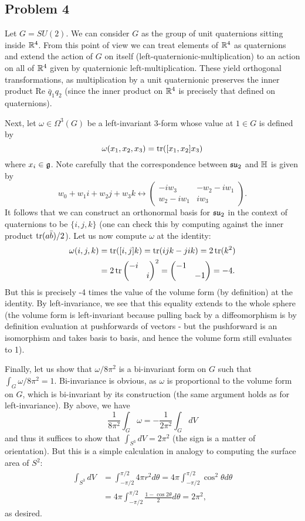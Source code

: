 \documentclass{../../mathnotes}
\begin{document}
\subsection*{Problem 4}

Let $G=SU(2)$. We can consider $G$ as the group of unit quaternions sitting inside $\mathbb{R}^4$. From this point of view we can treat elements of $\mathbb{R}^4$ as
quaternions and extend the action of $G$ on itself (left-quaternionic-multiplication) to an action on all of $\mathbb{R}^4$ given by quaternionic left-multiplication.
These yield orthogonal transformations, as multiplication by a unit quaternionic preserves the inner product $\text{Re }\bar q_1q_2$ (since the inner product on $\mathbb{R}^4$ is precisely
that defined on quaternions).

Next, let $\omega\in\Omega^3(G)$ be a left-invariant 3-form whose value at $1\in G$ is defined by
\[\omega(x_1,x_2,x_3)=\operatorname{tr} ([x_1,x_2]x_3)\]
where $x_i\in\mathfrak g$. Note carefully that the correspondence between $\mathfrak{su}_2$ and $\mathbb{H}$ is given by
\[w_0+w_1i+w_2j+w_3k \longleftrightarrow \begin{pmatrix}-iw_3&-w_2-iw_1\\w_2-iw_1&iw_3\end{pmatrix}.\]
It follows that we can construct an orthonormal basis for $\mathfrak{su}_2$ in the context of quaternions to be $\{i,j,k\}$ (one can check this
by computing against the inner product $\operatorname{tr}(a\bar b)/2$). Let us now compute $\omega$ at the identity:
\begin{align*}
    \omega(i,j,k)&=\operatorname{tr}([i,j]k)=\operatorname{tr}(ijk-jik)=2\operatorname{tr}(k^2)\\
    &=2\operatorname{tr}\begin{pmatrix}-i&\\&i\end{pmatrix}^2=\begin{pmatrix}-1&\\&-1\end{pmatrix}=-4.
\end{align*}
But this is precisely -4 times the value of the volume form (by definition) at the identity. By left-invariance, we see that this equality
extends to the whole sphere (the volume form is left-invariant because pulling back by a diffeomorphism is by definition evaluation at pushforwards
of vectors - but the pushforward is an isomorphism and takes basis to basis, and hence the volume form still evaluates to 1).

Finally, let us show that $\omega/8\pi^2$ is a bi-invariant form on $G$ such that $\int_G\omega/8\pi^2=1$.
Bi-invariance is obvious, as $\omega$ is proportional to the volume form on $G$, which is bi-invariant by its construction (the same argument holds as for
left-invariance).
By above, we have
\[\frac{1}{8\pi^2}\int_G\omega=-\frac{1}{2\pi^2}\int_G dV\]
and thus it suffices to show that $\int_{S^3} dV=2\pi^2$ (the sign is a matter of orientation). But this is a simple calculation in analogy to computing
the surface area of $S^2$:
\begin{align*}
    \int_{S^3} dV&=\int_{-\pi/2}^{\pi/2}4\pi r^2 d\theta=4\pi\int_{-\pi/2}^{\pi/2}\cos^2\theta d\theta\\
    &=4\pi\int_{-\pi/2}^{\pi/2}\frac{1-\cos2\theta}{2}d\theta=2\pi^2,
\end{align*}
as desired.
\end{document}
